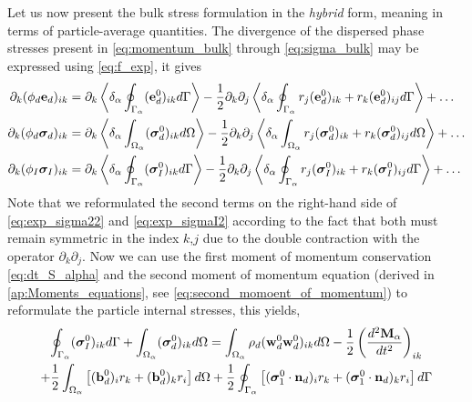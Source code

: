 
Let us now present the bulk stress formulation in the \textit{hybrid} form, meaning in terms of particle-average quantities.  
The divergence of the dispersed phase stresses present in \ref{eq:momentum_bulk} through \ref{eq:sigma_bulk} may be expressed using \ref{eq:f_exp}, it gives
\begin{align}
    \label{eq:exp_e2}
    \partial_k (\phi_d \textbf{e}_d)_{ik} 
    &=  \partial_k\left<\delta_\alpha \oint_{\Gamma_\alpha}  (\textbf e_d^0)_{ik}  d\Gamma\right>
        -\frac{1}{2} \partial_k\partial_j \left<\delta_\alpha \oint_{\Gamma_\alpha}  r_j (\textbf e_d^0)_{ik} +r_k (\textbf e_d^0)_{ij}  d\Gamma\right>
        + \ldots  \\
    \label{eq:exp_sigma22}
    \partial_k (\phi_d \bm\sigma_d)_{ik}
    &=  \partial_k\left<\delta_\alpha \int_{\Omega_\alpha}  (\bm\sigma_d^0)_{ik} d\Omega\right>
    -\frac{1}{2} \partial_k\partial_j
    \left<\delta_\alpha \int_{\Omega_\alpha}  r_j(\bm\sigma^0_d)_{ik} + r_k(\bm\sigma^0_d)_{ij} d\Omega\right>
    + \ldots  \\
    \label{eq:exp_sigmaI2}
    \partial_k (\phi_I \bm\sigma_I)_{ik} 
    &=  \partial_k\left<\delta_\alpha \oint_{\Gamma_\alpha}  (\bm\sigma_I^0)_{ik}  d\Gamma\right>
        -\frac{1}{2} \partial_k\partial_j \left<\delta_\alpha \oint_{\Gamma_\alpha}  r_j (\bm\sigma_I^0)_{ik} +r_k (\bm\sigma_I^0)_{ij}  d\Gamma\right>
        + \ldots  
\end{align}
Note that we reformulated the second terms on the right-hand side of \ref{eq:exp_sigma22} and \ref{eq:exp_sigmaI2} according to the fact that both must remain symmetric in the index $k$,$j$ due to the double contraction with the operator $\partial_k\partial_j$. 
Now we can use the first moment of momentum conservation \eqref{eq:dt_S_alpha} and the second moment of momentum equation (derived in \ref{ap:Moments_equations}, see \eqref{eq:second_momoent_of_momentum}) to reformulate the particle internal stresses, this yields,  
\begin{multline}
    \oint_{\Gamma_\alpha}  (\bm{\sigma}_I^0)_{ik} d\Gamma
    +\int_{\Omega_\alpha}  (\bm{\sigma}_d^0)_{ik} d\Omega
    = 
    \int_{\Omega_\alpha}  \rho_d 
    (\textbf{w}_d^0\textbf{w}_d^0  )_{ik}
     d\Omega
    -\frac{1}{2}\left(\frac{d^2 \textbf{M}_\alpha}{dt^2} \right)_{ik}\\
    +\frac{1}{2}\int_{\Omega_\alpha}  \left[
        (\textbf{b}_d^0)_i
        r_k 
        + (\textbf{b}_d^0)_k
        r_i
    \right] d\Omega
    +
    \frac{1}{2}\oint_{\Gamma_\alpha}  \left[
        (\bm{\sigma}_1^0 \cdot \textbf{n}_d)_i r_k
        + (\bm{\sigma}_1^0 \cdot \textbf{n}_d)_k r_i
    \right]
     d\Gamma
    \label{eq:dt_P1_alpha_bis}
\end{multline}
